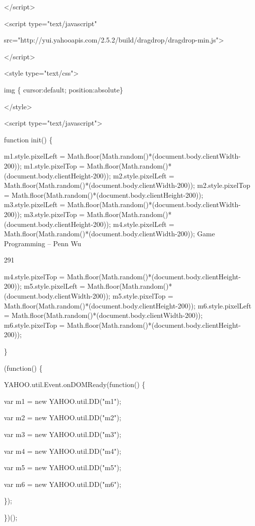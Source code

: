 \documentclass[
]{article}
\begin{document}
\textless/script\textgreater{}

\textless script type="text/javascript"

src="http://yui.yahooapis.com/2.5.2/build/dragdrop/dragdrop-min.js"\textgreater{}

\textless/script\textgreater{}

\textless style type="text/css"\textgreater{}

img \{ cursor:default; position:absolute\}

\textless/style\textgreater{}

\textless script type="text/javascript"\textgreater{}

function init() \{

m1.style.pixelLeft =
Math.floor(Math.random()*(document.body.clientWidth-200));
m1.style.pixelTop =
Math.floor(Math.random()*(document.body.clientHeight-200));
m2.style.pixelLeft =
Math.floor(Math.random()*(document.body.clientWidth-200));
m2.style.pixelTop =
Math.floor(Math.random()*(document.body.clientHeight-200));
m3.style.pixelLeft =
Math.floor(Math.random()*(document.body.clientWidth-200));
m3.style.pixelTop =
Math.floor(Math.random()*(document.body.clientHeight-200));
m4.style.pixelLeft =
Math.floor(Math.random()*(document.body.clientWidth-200)); Game
Programming -- Penn Wu

291

\protect\hypertarget{index_split_015.htmlux5cux23p292}{}{}m4.style.pixelTop
= Math.floor(Math.random()*(document.body.clientHeight-200));
m5.style.pixelLeft =
Math.floor(Math.random()*(document.body.clientWidth-200));
m5.style.pixelTop =
Math.floor(Math.random()*(document.body.clientHeight-200));
m6.style.pixelLeft =
Math.floor(Math.random()*(document.body.clientWidth-200));
m6.style.pixelTop =
Math.floor(Math.random()*(document.body.clientHeight-200));

\}

(function() \{

YAHOO.util.Event.onDOMReady(function() \{

var m1 = new YAHOO.util.DD("m1");

var m2 = new YAHOO.util.DD("m2");

var m3 = new YAHOO.util.DD("m3");

var m4 = new YAHOO.util.DD("m4");

var m5 = new YAHOO.util.DD("m5");

var m6 = new YAHOO.util.DD("m6");

\});

\})();
\end{document}
